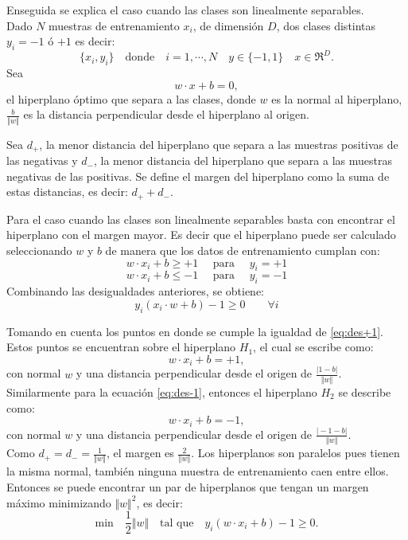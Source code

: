 Enseguida se explica el caso cuando las clases son linealmente separables.\\
Dado $N$ muestras de entrenamiento $x_i$, de dimensión $D$, dos clases distintas $y_i=-1$ ó $+1$ es decir: 
$$\lbrace x_i,y_i \rbrace \quad \text{donde} \quad  i=1, \cdots ,N \quad y\in \lbrace -1,1 \rbrace \quad x \in \Re^D.$$
Sea  
\begin{equation}\label{eq:hiper}
w \cdot x + b = 0 ,
\end{equation}  
el hiperplano óptimo que separa a las clases, donde $w$ es la normal al hiperplano, $\frac{b}{ \Vert w \Vert}$ es la distancia perpendicular desde el hiperplano al origen.

Sea $d_+$, la menor distancia del hiperplano que separa a las muestras positivas de las negativas y $d_-$, la menor distancia del hiperplano que separa a las muestras negativas de las positivas. Se define el margen del hiperplano como la suma de estas distancias, es decir: $d_+ + d_-$.

Para el caso cuando las clases son linealmente separables basta con encontrar el hiperplano con el margen mayor. Es decir que el hiperplano puede ser calculado seleccionando $w$ y $b$ de manera que los datos de entrenamiento cumplan con:  
\begin{equation}\label{eq:des+1}
w \cdot x_i + b \geqslant +1 \quad \textrm{ para } \quad y_i=+1
\end{equation} 
\begin{equation}\label{eq:des-1}
w \cdot x_i + b \leqslant -1 \quad \textrm{ para } \quad y_i=-1
\end{equation} 
Combinando las desigualdades anteriores, se obtiene:  
\begin{equation}
y_i(x_i \cdot w + b) -1 \geqslant 0 \qquad \forall i 
\end{equation} 

Tomando en cuenta los puntos en donde se cumple la igualdad de \ref{eq:des+1}. Estos puntos se encuentran sobre el hiperplano $H_1$, el cual se escribe como: 
\begin{equation}\label{eq:eq+1}
w \cdot x_i + b = +1,  
\end{equation} 
con normal $w$ y una distancia perpendicular desde el origen de $\frac{\vert 1-b \vert}{ \Vert w \Vert}$. 
Similarmente para la ecuación \ref{eq:des-1}, entonces el hiperplano $H_2$ se describe como: 
\begin{equation}\label{eq:eq+1}
w \cdot x_i + b = -1,  
\end{equation} 
con normal $w$ y una distancia perpendicular desde el origen de $\frac{\vert-1-b\vert}{ \Vert w \Vert}$.\\ 
Como $d_+ = d_- = \frac{1}{\Vert w \Vert}$, el margen es $\frac{2}{\Vert w \Vert}$. Los hiperplanos son paralelos pues tienen la misma normal, también ninguna muestra de entrenamiento caen entre ellos. Entonces se puede encontrar un par de hiperplanos  que tengan un margen máximo minimizando $\Vert w \Vert^2$, es decir:  
\begin{equation}
\text{min} \quad \frac{1}{2} \Vert w \Vert \quad \text{tal que} \quad y_i(w \cdot x_i + b) -1 \geq 0.
\end{equation}  




\newpage
